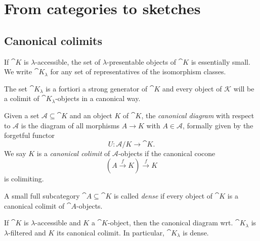 \section{From categories to sketches}
\label{seq:catstoskeches}

\subsection{Canonical colimits}
\begin{Definition}
If $\cat K$ is $\lambda$-accessible, the set of $\lambda$-presentable objects of $\cat K$ is essentially small. We write $\cat K_\lambda$ for any set of representatives of the isomorphism classes.
\end{Definition}


The set $\cat K_\lambda$ is a fortiori a strong generator of $\cat K$ and every object of $\mathcal K$ will be a colimit of $\cat K_\lambda$-objects in a canonical way.

\begin{Definition}
Given a set $\mathcal A \subseteq \cat K$ and an object $K$ of $\cat K$, the \emph{canonical diagram} with respect to $\mathcal A$ is the diagram of all morphisms $A \to K$ with $A \in \mathcal A$, formally given by the forgetful functor
\[ U : \mathcal A/K \to \cat K. \]
We say $K$ is a \emph{canonical colimit} of $\mathcal A$-objects if the canonical cocone 
\[ (A \xrightarrow{f} K) \xrightarrow{f} K \]
is colimiting. 
\end{Definition}
\begin{Definition}
A small full subcategory $\cat A \subseteq \cat K$ is called \emph{dense} if every object of $\cat K$ is a canonical colimit of $\cat A$-objects.
\end{Definition}

\begin{Proposition}
If $\cat K$ is $\lambda$-accessible and $K$ a $\cat K$-object, then the canonical diagram wrt. $\cat K_\lambda$ is $\lambda$-filtered and $K$ its canonical colimit. In particular, $\cat K_\lambda$ is dense.
\end{Proposition}